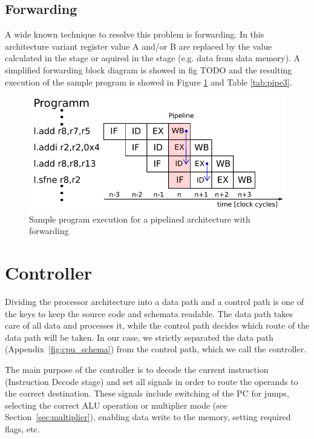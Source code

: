 \subsection{Forwarding}
A wide known technique to resolve this problem is forwarding. In this architecture variant register value A and/or B are replaced by the value calculated in the  stage or aquired in the  stage (e.g. data from data memory). A simplified forwarding block diagram is showed in fig TODO and the resulting execution of the sample program is showed in Figure \ref{fig:pipe3} and Table \ref{tab:pipe3}.

\begin{figure}[h!]
  \centering
  \includegraphics[scale=0.8]{./figures/pipeline3}
  \caption{Sample program execution for a pipelined architecture with forwarding}
  \label{fig:pipe3}
\end{figure}


\section{Controller}

Dividing the processor architecture into a data path and a control path is one of the keys to keep the source code and schemata readable. The data path takes care of all data and processes it, while the control path decides which route of the data path will be taken. In our case, we strictly separated the data path (Appendix~\ref{fig:cpu_schema}) from the control path, which we call the controller.

The main purpose of the controller is to decode the current instruction (Instruction Decode stage) and set all signals in order to route the operands to the correct destination. These signals include switching of the PC for jumps, selecting the correct ALU operation or multiplier mode (see Section~\ref{sec:multiplier}), enabling data write to the memory, setting required flags, etc.

